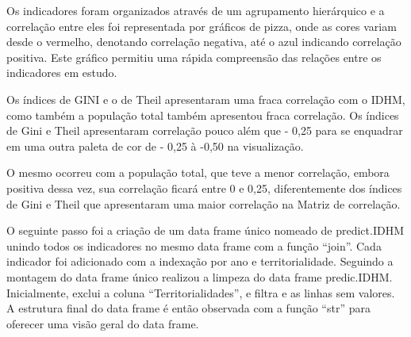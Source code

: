 \documentclass[
]{article}
\begin{document}
Os indicadores foram organizados através de um agrupamento hierárquico e
a correlação entre eles foi representada por gráficos de pizza, onde as
cores variam desde o vermelho, denotando correlação negativa, até o azul
indicando correlação positiva. Este gráfico permitiu uma rápida
compreensão das relações entre os indicadores em estudo.

Os índices de GINI e o de Theil apresentaram uma fraca correlação com o
IDHM, como também a população total também apresentou fraca correlação.
Os índices de Gini e Theil apresentaram correlação pouco além que - 0,25
para se enquadrar em uma outra paleta de cor de - 0,25 à -0,50 na
visualização.

O mesmo ocorreu com a população total, que teve a menor correlação,
embora positiva dessa vez, sua correlação ficará entre 0 e 0,25,
diferentemente dos índices de Gini e Theil que apresentaram uma maior
correlação na Matriz de correlação.

O seguinte passo foi a criação de um data frame único nomeado de
predict.IDHM unindo todos os indicadores no mesmo data frame com a
função ``join''. Cada indicador foi adicionado com a indexação por ano e
territorialidade. Seguindo a montagem do data frame único realizou a
limpeza do data frame predic.IDHM. Inicialmente, exclui a coluna
``Territorialidades'', e filtra e as linhas sem valores. A estrutura
final do data frame é então observada com a função ``str'' para oferecer
uma visão geral do data frame.
\end{document}
